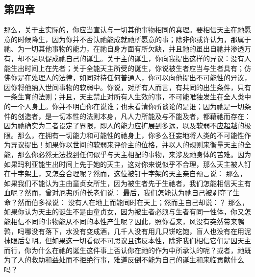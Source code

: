 
\subsection{第四章}

\par

那么，关于主实际的，你应当宣认与一切其他事物相同的真理。要相信天主在祂愿意的时候降生，因为你并不否认祂能成就祂所愿意的事；除非你或许认为，那属于祂、为一切其他事物的能力，在祂自身方面有所欠缺，并且祂的虽出自祂并渗透万有，却不足以促成祂自己的诞生。关于主的诞生，你向我提出这样的异议：没有人能生出时间上在先者；关于全能天主所受的诞生，你说被生者应当与生者具有；仿佛你是在处理人的法律，如同对待任何普通人，你可以向他提出不可能性的异议，因你将他纳入世间事物的软弱中。你说，对所有人而言，有共同的出生条件，只有一条生育的法则；并且，天主禁止对所有人生效的事，不可能唯独发生在全人类中的一个人身上。你并不明白你在说谁；也未看清你所谈论的是谁；因为祂是一切条件的创造者，是一切本性的法则本身，凡人力所能及与不能及者，都藉祂而存在：因为祂确实为二者设定了界限，即人的能力应扩展到多远，以及软弱不应超越的极限。那么，在拥有一切能力和可能性的祂身上，你多么狂妄地将人类的不可能性作为异议提出！如果你以世间的软弱来评价主的位格，并以人的规则来衡量天主的全能，那么你必然无法找到任何似乎与天主相配的事物，来涉及祂身体的苦难。因为如果玛利亚能生出时间上先于她的天主，这对你来说似乎不合理，那么天主被人钉在十字架上，又怎会合理呢？然而，这位被钉十字架的天主亲自预言说：  那么，如果我们不能认为主由童贞女所生，因为被生者先于生祂者，我们怎能相信天主有血呢？然而，曾对厄弗所的长老们说：  最后，我们怎能认为祂自己被剥夺了生命？然而伯多禄说：  没有人在地上而能同时在天上；然而主自己却说：？  那么，如果你认为天主的诞生不是由童贞女，因为被生者必须与生者有同一性体，你又怎能相信不同的事物能从不同的本性产生呢？因此，照你看来，风没有突然带来鹌鹑，吗哪没有落下，水没有变成酒，几千人没有用几只饼吃饱，盲人也没有在用泥抹眼后复明。但如果这一切看似不可思议且违反本性，除非我们相信它们是因天主而行，你为什么在祂的诞生这件事上否认你在祂的作为中所承认的呢？或者，祂既为了人的救助和益处而不拒绝行事，难道反倒不能为自己的诞生和来临贡献什么吗？\par

